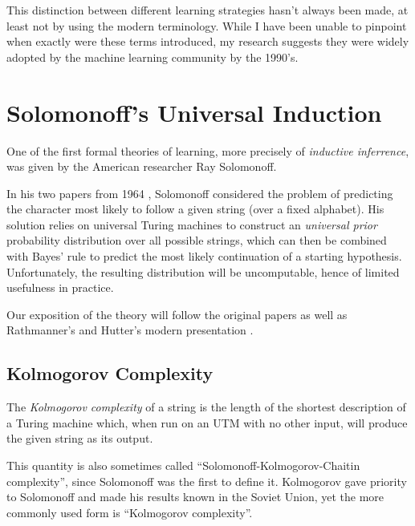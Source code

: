 \begin{remark*}
This distinction between different learning strategies hasn't always been made, at least not by using the modern terminology. While I have been unable to pinpoint when exactly were these terms introduced, my research suggests they were widely adopted by the machine learning community by the 1990's.   
\end{remark*}

\section{Solomonoff's Universal Induction}

One of the first formal theories of learning, more precisely of \emph{inductive inferrence}, was given by the American researcher Ray Solomonoff.

In his two papers from 1964 \cite{Solomonoff1964_PartI, Solomonoff1964_PartII}, Solomonoff considered the problem of predicting the character most likely to follow a given string (over a fixed alphabet). His solution relies on universal Turing machines to construct an \emph{universal prior} probability distribution over all possible strings, which can then be combined with Bayes' rule to predict the most likely continuation of a starting hypothesis. Unfortunately, the resulting distribution will be uncomputable, hence of limited usefulness in practice.

Our exposition of the theory will follow the original papers as well as Rathmanner's and Hutter's modern presentation \cite{Rathmanner2011}.

\subsection{Kolmogorov Complexity}


\begin{definition}
The \emph{Kolmogorov complexity} of a string is the length of the shortest description of a Turing machine which, when run on an UTM with no other input, will produce the given string as its output.
\end{definition}

\begin{remark*}
This quantity is also sometimes called ``Solomonoff-Kolmogorov-Chaitin complexity'', since Solomonoff was the first to define it. Kolmogorov gave priority to Solomonoff and made his results known in the Soviet Union, yet the more commonly used form is ``Kolmogorov complexity''.
\end{remark*}

